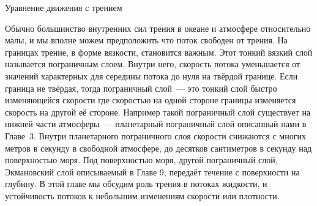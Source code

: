 
\begin{chapter}{Уравнение движения с трением}\label{chap:8}

Обычно большинство внутренних сил трения в океане и атмосфере
относительно малы, и мы вполне можем предположить что поток свободен
от трения. На границах трение, в форме вязкости, становится
важным. Этот тонкий вязкий слой называется пограничным слоем. Внутри
него, скорость потока уменьшается от значений характерных для середины
потока до нуля на твёрдой границе. Если граница не твёрдая, тогда
пограничный слой~--- это тонкий слой быстро изменяющейся скорости где
скоростью на одной стороне границы изменяется скорость на другой её
стороне. Например такой пограничный слой существует на нижней части
атмосферы~--- планетарный пограничный слой описанный нами в Главе~3.
Внутри планетарного пограничного слоя скорости снижаются с многих
метров в секунду в свободной атмосфере, до десятков сантиметров в
секунду над поверхностью моря. Под поверхностью моря, другой
пограничный слой, Экмановский слой описываемый в Главе 9, передаёт
течение с поверхности на глубину. В этой главе мы обсудим роль трения
в потоках жидкости, и устойчивость потоков к небольшим изменениям
скорости или плотности.
%



\end{chapter}
